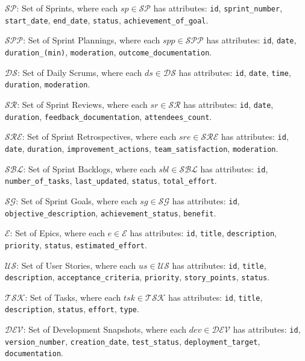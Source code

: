 \documentclass[12pt]{article}
\begin{document}
    \item $\mathcal{SP}$: Set of Sprints, where each $sp \in \mathcal{SP}$ has attributes: \texttt{id}, \texttt{sprint\_number}, \texttt{start\_date}, \texttt{end\_date}, \texttt{status}, \texttt{achievement\_of\_goal}.
    \item $\mathcal{SPP}$: Set of Sprint Plannings, where each $spp \in \mathcal{SPP}$ has attributes: \texttt{id}, \texttt{date}, \texttt{duration\_(min)}, \texttt{moderation}, \texttt{outcome\_documentation}.
    \item $\mathcal{DS}$: Set of Daily Scrums, where each $ds \in \mathcal{DS}$ has attributes: \texttt{id}, \texttt{date}, \texttt{time}, \texttt{duration}, \texttt{moderation}.
    \item $\mathcal{SR}$: Set of Sprint Reviews, where each $sr \in \mathcal{SR}$ has attributes: \texttt{id}, \texttt{date}, \texttt{duration}, \texttt{feedback\_documentation}, \texttt{attendees\_count}.
    \item $\mathcal{SRE}$: Set of Sprint Retrospectives, where each $sre \in \mathcal{SRE}$ has attributes: \texttt{id}, \texttt{date}, \texttt{duration}, \texttt{improvement\_actions}, \texttt{team\_satisfaction}, \texttt{moderation}.
    \item $\mathcal{SBL}$: Set of Sprint Backlogs, where each $sbl \in \mathcal{SBL}$ has attributes: \texttt{id}, \texttt{number\_of\_tasks}, \texttt{last\_updated}, \texttt{status}, \texttt{total\_effort}.
    \item $\mathcal{SG}$: Set of Sprint Goals, where each $sg \in \mathcal{SG}$ has attributes: \texttt{id}, \texttt{objective\_description}, \texttt{achievement\_status}, \texttt{benefit}.
    \item $\mathcal{E}$: Set of Epics, where each $e \in \mathcal{E}$ has attributes: \texttt{id}, \texttt{title}, \texttt{description}, \texttt{priority}, \texttt{status}, \texttt{estimated\_effort}.
    \item $\mathcal{US}$: Set of User Stories, where each $us \in \mathcal{US}$ has attributes: \texttt{id}, \texttt{title}, \texttt{description}, \texttt{acceptance\_criteria}, \texttt{priority}, \texttt{story\_points}, \texttt{status}.
    \item $\mathcal{TSK}$: Set of Tasks, where each $tsk \in \mathcal{TSK}$ has attributes: \texttt{id}, \texttt{title}, \texttt{description}, \texttt{status}, \texttt{effort}, \texttt{type}.
    \item $\mathcal{DEV}$: Set of Development Snapshots, where each $dev \in \mathcal{DEV}$ has attributes: \texttt{id}, \texttt{version\_number}, \texttt{creation\_date}, \texttt{test\_status}, \texttt{deployment\_target}, \texttt{documentation}.
\end{document}
